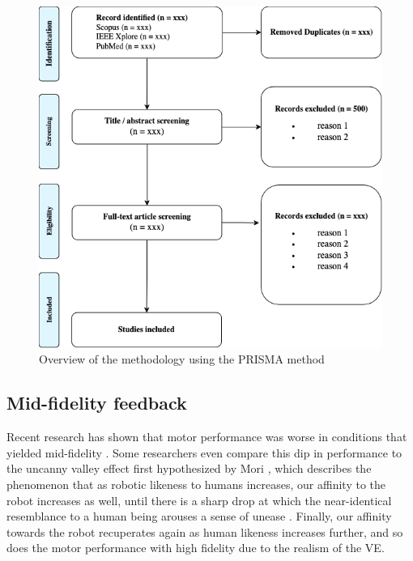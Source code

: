 \documentclass[conference]{IEEEtran}
\begin{document}
\begin{figure}[ht]
    \centering
    \includegraphics[width=\columnwidth]{prisma_overview.png} 
    \caption{Overview of the methodology using the PRISMA method}
    \label{fig:my_label}
\end{figure}


\subsection{Mid-fidelity feedback}
Recent research has shown that motor performance was worse in conditions that yielded mid-fidelity \cite{MahdiNabiyouni201520153DUI.}.
Some researchers even compare this dip in performance to the uncanny valley effect first hypothesized by Mori \cite{Mori2012TheValley}, which describes the phenomenon that as robotic likeness to humans increases, our affinity to the robot increases as well, until there is a sharp drop at which the near-identical resemblance to a human being arouses a sense of unease \cite{Bhargava2018EvaluatingSimulations}. Finally, our affinity towards the robot recuperates again as human likeness increases further, and so does the motor performance with high fidelity due to the realism of the VE. 
\end{document}
